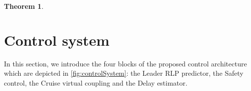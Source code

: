 \documentclass[letterpaper, 10 pt, conference]{ieeeconf}
\newcounter{Definition}
\theoremstyle{definition}
\theoremstyle{nopoint}
\newtheorem{theorem}{Theorem}[section]
\newcounter{Theorem}
\begin{document}
\begin{theorem}
%
%
%
%
%
%
\end{theorem}







\section{Control system}
 \label{sec:controlsystem}

\begin{comment}
	\textcolor{red}{Mettere qui la parte di descrizione dell'archiettura di controllo. Questa parte va aggiustata e uniformata a quello che segue. Eviterei nomi troppo pomposi. L'architettura di controllo comprende: leader RLP predictor block, safety control block, cruise virtual coupling control block (che noi ipotizziamo come switching a livelli). Questi tre blocchi sono studiati in tre diverse sezioni del paper. Qui si dà un'introduzione generale all'architettura. Questo pezzo va quindi riscritto secondo quanto sviluppato nel seguito.} 
\end{comment}


In this section, we introduce the four blocks of the proposed control architecture which are depicted in \ref{fig:controlSystem}: the Leader RLP predictor, the Safety control, the Cruise virtual coupling and the Delay estimator.
 
\end{document}
